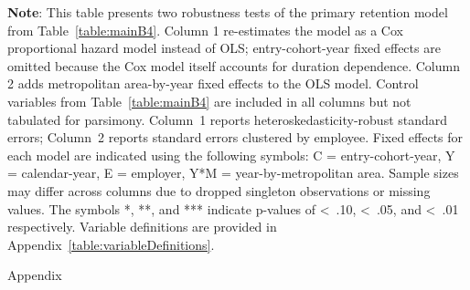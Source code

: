 \documentclass[11pt]{article}
\begin{document}
\clearpage
\begin{table}[!htbp]
\begin{flushleft}
    \begin{threeparttable}[b]

        \captionsetup{labelfont=bf, singlelinecheck=off, justification=raggedright, labelsep=none}
        \caption{: Robustness tests}

        

        \begin{tablenotes}
            \footnotesize
            \item \textbf{Note}: This table presents two robustness tests of the primary retention model from Table~\ref{table:mainB4}. Column 1 re-estimates the model as a Cox proportional hazard model instead of OLS; entry-cohort-year fixed effects are omitted because the Cox model itself accounts for duration dependence. Column 2 adds metropolitan area-by-year fixed effects to the OLS model. Control variables from Table~\ref{table:mainB4} are included in all columns but not tabulated for parsimony. Column~1 reports heteroskedasticity-robust standard errors; Column~2 reports standard errors clustered by employee. Fixed effects for each model are indicated using the following symbols: C = entry-cohort-year, Y = calendar-year, E = employer, Y*M = year-by-metropolitan area. Sample sizes may differ across columns due to dropped singleton observations or missing values. The symbols *, **, and *** indicate p-values of \textless\, .10, \textless\, .05, and \textless\, .01 respectively. Variable definitions are provided in Appendix~\ref{table:variableDefinitions}.
        \end{tablenotes}
        \label{table:robustnessModels}
    \end{threeparttable}
\end{flushleft}
\end{table}


\appendix

\renewcommand{\tablename}{Table} 
\renewcommand{\thetable}{A\arabic{table}} 
\setcounter{table}{0}

\clearpage
\Large
Appendix
\small

\singlespacing
\end{document}
